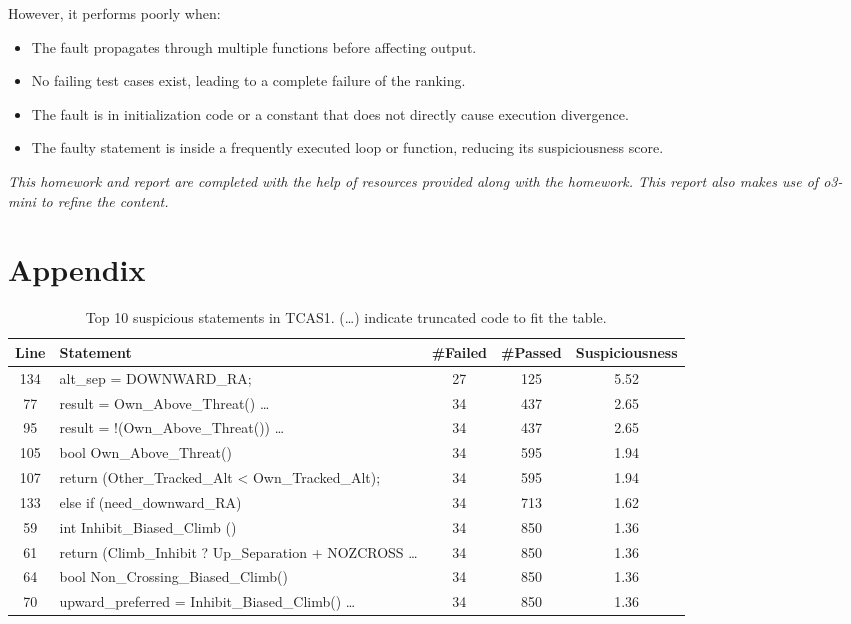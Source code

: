 \documentclass[conference]{IEEEtran}
\begin{document}
However, it performs poorly when:
\begin{itemize}
    \item The fault propagates through multiple functions before affecting output.
    \item No failing test cases exist, leading to a complete failure of the ranking.
    \item The fault is in initialization code or a constant that does not directly cause execution divergence.
    \item The faulty statement is inside a frequently executed loop or function, reducing its suspiciousness score.
\end{itemize}


\textit{This homework and report are completed with the help of resources provided along with the homework. This report also makes use of o3-mini to refine the content.}

\appendix
\section{Appendix}
\label{appendix:TCAS1}
\begin{table}[h]
    \centering
    \footnotesize
    \begin{tabular}{|c|p{3cm}|c|c|c|}
        \hline
        \textbf{Line} & \textbf{Statement} & \#Failed & \#Passed & \textbf{Suspiciousness} \\
        \hline
        134 & alt\_sep = DOWNWARD\_RA; & 27 & 125 & 5.52 \\
        77  & result = Own\_Above\_Threat() \dots & 34 & 437 & 2.65 \\
        95  & result = !(Own\_Above\_Threat()) \dots & 34 & 437 & 2.65 \\
        105 & bool Own\_Above\_Threat() & 34 & 595 & 1.94 \\
        107 & return (Other\_Tracked\_Alt < Own\_Tracked\_Alt); & 34 & 595 & 1.94 \\
        133 & else if (need\_downward\_RA) & 34 & 713 & 1.62 \\
        59  & int Inhibit\_Biased\_Climb () & 34 & 850 & 1.36 \\
        61  & return (Climb\_Inhibit ? Up\_Separation + NOZCROSS \dots & 34 & 850 & 1.36 \\
        64  & bool Non\_Crossing\_Biased\_Climb() & 34 & 850 & 1.36 \\
        70  & upward\_preferred = Inhibit\_Biased\_Climb() \dots & 34 & 850 & 1.36 \\
        \hline
    \end{tabular}
    \caption{Top 10 suspicious statements in TCAS1. (\dots) indicate truncated code to fit the table.}
\end{table}
\end{document}
